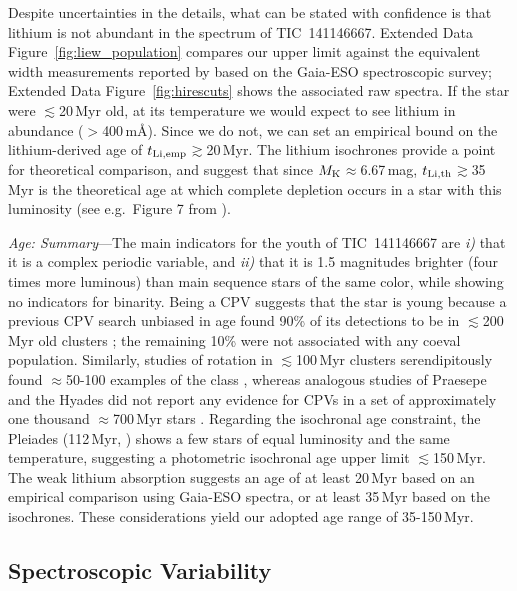 \documentclass{nature3}
\begin{document}
\begin{methods}
Despite uncertainties in the details, what can be stated with
confidence is that lithium is not abundant in the spectrum of
TIC~141146667.  Extended Data Figure~\ref{fig:liew_population}
compares our upper limit against the equivalent width measurements
reported by \cite{Jeffries2023} based on the Gaia-ESO spectroscopic
survey; Extended Data Figure~\ref{fig:hirescuts} shows the associated
raw spectra.  If the star were $\lesssim$20\,Myr old, at its
temperature we would expect to see lithium in abundance
($>$400\,m\AA).  Since we do not, we can set an empirical bound on the
lithium-derived age of $t_{\rm Li,emp}$$\gtrsim$20\,Myr.  The
\cite{Feiden2016} lithium isochrones provide a point for theoretical
comparison, and suggest that since $M_{\rm K}$$\approx$6.67\,mag,
$t_{\rm Li,th}$$\gtrsim$35\,Myr is the theoretical age at which
complete depletion occurs in a star with this luminosity (see
e.g.~Figure 7 from \cite{Wood2023}).




{\it Age: Summary}---The main indicators for the youth of
TIC~141146667 are {\it i)} that it is a complex periodic variable, and
{\it ii)} that it is 1.5 magnitudes brighter (four times more
luminous) than main sequence stars of the same color, while showing no
indicators for binarity.  Being a CPV suggests that the star is young
because a previous CPV search unbiased in age found 90\% of its
detections to be in $\lesssim$200\,Myr old clusters \cite{Bouma2024};
the remaining 10\% were not associated with any coeval population.
Similarly, studies of rotation in $\lesssim$100\,Myr clusters
serendipitously found $\approx$50-100 examples of the class
\cite{Rebull2016,Stauffer2017,Stauffer2018,Rebull2018,Zhan2019,Rebull2020,Stauffer2021,Rebull2022,Popinchalk2023},
whereas analogous studies of Praesepe and the Hyades did not report
any evidence for CPVs in a set of approximately one thousand
$\approx$700\,Myr stars \cite{Rebull2017,Douglas2019,Rampalli2021}.
Regarding the isochronal age constraint, the Pleiades (112\,Myr,
\cite{Dahm2015}) shows a few stars of equal luminosity and the same
temperature, suggesting a photometric isochronal age upper limit
$\lesssim$150\,Myr.  The weak lithium absorption suggests an age of at
least 20\,Myr based on an empirical comparison using Gaia-ESO spectra,
or at least 35\,Myr based on the \cite{Feiden2016} isochrones.  These
considerations yield our adopted age range of 35-150\,Myr.




\subsection{Spectroscopic Variability}\phantom{+}
\label{subsec:specvar}


\end{methods}
\end{document}
